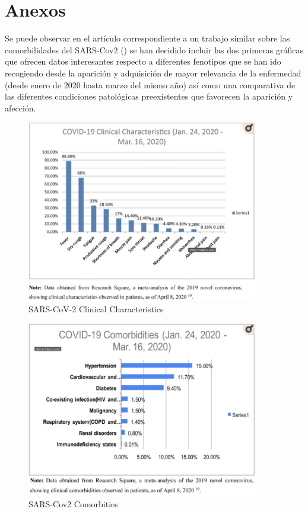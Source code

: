 \section{Anexos}

Se puede observar en el artículo correspondiente a un trabajo similar sobre las comorbilidades del SARS-Cov2 (\cite{Sanyaolu2020}) se han decidido incluir las dos primeras gráficas que ofrecen datos interesantes respecto a diferentes fenotipos que se han ido recogiendo desde la aparición y adquisición de mayor relevancia de la enfermedad (desde enero de 2020 hasta marzo del mismo año) así como una comparativa de las diferentes condiciones patológicas preexistentes que favorecen la aparición y afección.

\begin{figure}[h!]
		\includegraphics[width=0.9\textwidth]{figures/COVIDClinCharac.png}
		\caption{SARS-CoV-2 Clinical Characteristics}
		\label{fig:covid_clin_char}
	\end{figure}
	
	\begin{figure}[h!]
		\includegraphics[width=0.9\textwidth]{figures/COVIDComorb.png}
		\caption{SARS-Cov2 Comorbities}
		\label{fig:covid_comorb}
	\end{figure}
